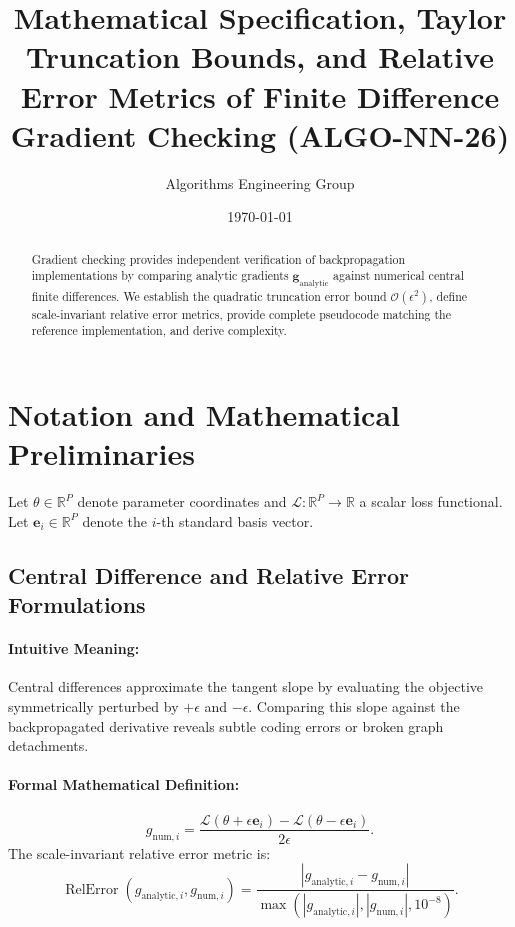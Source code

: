 \documentclass[11pt]{article}
\title{\textbf{Mathematical Specification, Taylor Truncation Bounds, and Relative Error Metrics of Finite Difference Gradient Checking (ALGO-NN-26)}}
\author{Algorithms Engineering Group}
\date{\today}
\begin{document}
\maketitle

\begin{abstract}
Gradient checking provides independent verification of backpropagation implementations by comparing analytic gradients $\mathbf{g}_{\mathrm{analytic}}$ against numerical central finite differences. We establish the quadratic truncation error bound $\mathcal{O}(\epsilon^2)$, define scale-invariant relative error metrics, provide complete pseudocode matching the reference implementation, and derive complexity.
\end{abstract}

\section{Notation and Mathematical Preliminaries}
\label{sec:notation}

Let $\theta \in \mathbb{R}^P$ denote parameter coordinates and $\mathcal{L}: \mathbb{R}^P \to \mathbb{R}$ a scalar loss functional. Let $\mathbf{e}_i \in \mathbb{R}^P$ denote the $i$-th standard basis vector.

\subsection{Central Difference and Relative Error Formulations}
\paragraph{Intuitive Meaning:} Central differences approximate the tangent slope by evaluating the objective symmetrically perturbed by $+\epsilon$ and $-\epsilon$. Comparing this slope against the backpropagated derivative reveals subtle coding errors or broken graph detachments.

\paragraph{Formal Mathematical Definition:}
\begin{equation}
\label{eq:central_diff}
g_{\mathrm{num}, i} = \frac{\mathcal{L}(\theta + \epsilon \mathbf{e}_i) - \mathcal{L}(\theta - \epsilon \mathbf{e}_i)}{2\epsilon}.
\end{equation}
The scale-invariant relative error metric is:
\begin{equation}
\label{eq:rel_error}
\operatorname{RelError}(g_{\mathrm{analytic}, i}, g_{\mathrm{num}, i}) = \frac{|g_{\mathrm{analytic}, i} - g_{\mathrm{num}, i}|}{\max(|g_{\mathrm{analytic}, i}|, |g_{\mathrm{num}, i}|, 10^{-8})}.
\end{equation}
\end{document}
